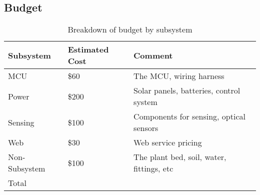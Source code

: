 \subsection{Budget}
\begin{table}[H]
    \centering
    \begin{tabularx}{.8\textwidth}
        {
            | >{\raggedright\arraybackslash}X
            | >{\raggedright\arraybackslash}X
            | >{\raggedleft\arraybackslash}X
            |
        }
        \hline
        Subsystem & Estimated Cost & Comment \\
        \hline
        MCU & \$60 & The MCU, wiring harness \\         %
        \hline
        Power & \$200 & Solar panels, batteries, control system \\
        \hline
        Sensing & \$100 & Components for sensing, optical sensors \\
        \hline
        Web & \$30 & Web service pricing \\             %
        \hline
        Non-Subsystem & \$100 & The plant bed, soil, water, fittings, etc \\
        \hline
        Total & \multicolumn{2}{|c|}{\$490}\\           %
        \hline
    \end{tabularx}
    \caption{Breakdown of budget by subsystem}
\end{table}